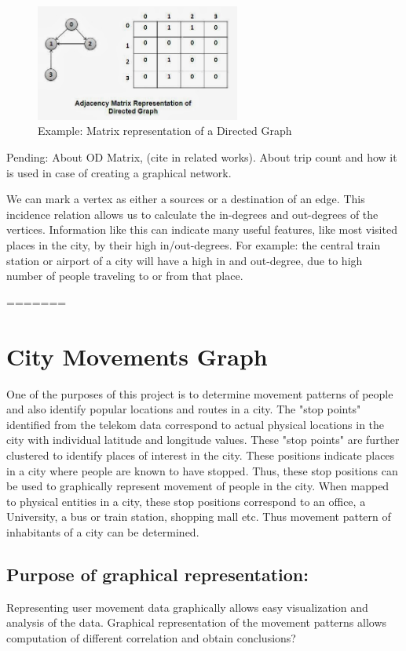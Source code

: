 \begin{figure}[!ht]
	\centering
	\includegraphics[width=0.6\textwidth]{images/AdjacencyMatrixExample.JPG}
	\caption{ Example: Matrix representation of a Directed Graph}
	\label{fig:Graph}
\end{figure} 

Pending: About OD Matrix, (cite in related works). About trip count and how it is used in case of creating a graphical network.

We can mark a vertex as either a sources or a destination of an edge. This incidence relation allows us to calculate the in-degrees and out-degrees of the vertices. Information like this can indicate many useful features, like most visited places in the city, by their high in/out-degrees. For example: the central train station or airport of a city will have a high in and out-degree, due to high number of people traveling to or from that place.

\FloatBarrier=======
\section{City Movements Graph}
One of the purposes of this project is to determine movement patterns of people and also identify popular locations and routes in a city. The "stop points" identified from the telekom data correspond to actual physical locations in the city with individual latitude and longitude values. These "stop points" are further clustered to identify places of interest in the city. These positions indicate places in a city where people are known to have stopped. Thus, these stop positions can be used to graphically represent movement of people in the city. When mapped to physical entities in a city, these stop positions correspond to an office, a University, a bus or train station, shopping mall etc. Thus movement pattern of inhabitants of a city can be determined.

\subsection {Purpose of graphical representation:} Representing user movement data graphically allows easy visualization and analysis of the data. Graphical representation of the movement patterns allows computation of different correlation and obtain conclusions?

